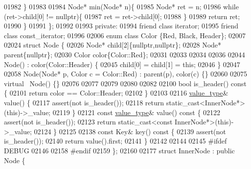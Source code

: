 \begin{DoxyCode}
01982         \}
01983 
01984         Node* min(Node* n)\{
01985             Node* ret = n;
01986             \textcolor{keywordflow}{while} (ret->child[0] != \textcolor{keyword}{nullptr})\{
01987                 ret = ret->child[0];
01988             \}
01989             \textcolor{keywordflow}{return} ret;
01990         \}
01991     \};
01992 
01993 \textcolor{keyword}{private}:
01994     \textcolor{keyword}{friend} \textcolor{keyword}{class }iterator;
01995     \textcolor{keyword}{friend} \textcolor{keyword}{class }const\_iterator;
01996 
02006     \textcolor{keyword}{enum class} Color \{Red, Black, Header\};
02007 
02024     \textcolor{keyword}{struct }Node \{
02026         Node* child[2]\{\textcolor{keyword}{nullptr},\textcolor{keyword}{nullptr}\};
02028         Node* parent\{\textcolor{keyword}{nullptr}\};
02030         Color color\{Color::Red\};
02031 
02033 
02034 
02036 
02044         Node() : color(Color::Header) \{
02045             child[0] = child[1] = \textcolor{keyword}{this};
02046         \}
02047 
02058         Node(Node* p, Color c = Color::Red) : parent(p), color(c) \{\}
02060         
02075         \textcolor{keyword}{virtual} ~Node() \{\}
02076 
02077 
02079 
02080 
02082 
02100         \textcolor{keywordtype}{bool} is\_header()\textcolor{keyword}{ const }\{
02101             \textcolor{keywordflow}{return} color == Color::Header;
02102         \}
02103 
02116         \hyperlink{classaed2_1_1map_a719db98e0ff9a837610f76be33264680_a719db98e0ff9a837610f76be33264680}{value\_type}& value() \{
02117             assert(not is\_header());
02118             \textcolor{keywordflow}{return} \textcolor{keyword}{static\_cast<}InnerNode*\textcolor{keyword}{>}(\textcolor{keyword}{this})->\_value;
02119         \}
02121         \textcolor{keyword}{const} \hyperlink{classaed2_1_1map_a719db98e0ff9a837610f76be33264680_a719db98e0ff9a837610f76be33264680}{value\_type}& value()\textcolor{keyword}{ const }\{
02122             assert(not is\_header());
02123             \textcolor{keywordflow}{return} \textcolor{keyword}{static\_cast<}\textcolor{keyword}{const }InnerNode*\textcolor{keyword}{>}(\textcolor{keyword}{this})->\_value;
02124         \}
02125 
02138         \textcolor{keyword}{const} Key& key()\textcolor{keyword}{ const }\{
02139             assert(not is\_header());
02140             \textcolor{keywordflow}{return} value().first;
02141         \}
02142 
02144 
02145 \textcolor{preprocessor}{#ifdef DEBUG}
02146 
02158 \textcolor{preprocessor}{#endif}
02159     \};
02160 
02177     \textcolor{keyword}{struct }InnerNode : \textcolor{keyword}{public} Node \{

\end{DoxyCode}
